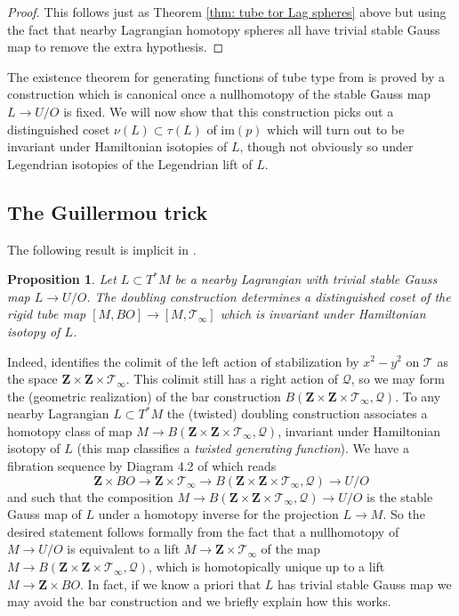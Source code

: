 \documentclass{amsart}
\newcommand\cQ{\mathcal{Q}}
\newcommand\cT{\mathcal{T}}
\def\bZ{\mathbf{Z}}
\newtheorem{proposition}[theorem]{Proposition}
\theoremstyle{definition}
\theoremstyle{remark}
\newtheorem{inductive lemma}[theorem]{Inductive Lemma}
\begin{document}
\begin{proof} This follows just as Theorem \ref{thm: tube tor Lag spheres}  above but using the fact that nearby Lagrangian homotopy spheres all have trivial stable Gauss map \cite{ACGK} to remove the extra hypothesis. \end{proof} 


The existence theorem for generating functions of tube type from \cite{ACGK} is proved by a construction which is canonical once a nullhomotopy of the stable Gauss map $L \to U/O$ is fixed. We will now show that this construction picks out a distinguished coset $\nu(L) \subset \tau(L)$ of  $\text{im}(p)$ which will turn out to be invariant under Hamiltonian isotopies of $L$, though not obviously so under Legendrian isotopies of the Legendrian lift of $L$. 

\subsection{The Guillermou trick} 
\label{sec: DoublingConstruction}

The following result is implicit in \cite{ACGK}.

\begin{proposition}\label{prop: natural coset}
Let $L \subset T^*M$ be a nearby Lagrangian with trivial stable Gauss map $L \to U/O$. The doubling construction determines a distinguished coset of the rigid tube map $[M,BO] \to [M,\cT_\infty ]$ which is invariant under Hamiltonian isotopy of $L$.
\end{proposition}

Indeed, \cite{ACGK} identifies the colimit of the left action of stabilization by $x^2-y^2$ on $\cT$ as the space $\bZ \times \bZ \times \cT_\infty$. This colimit still has a right action of $\cQ$, so we may form the (geometric realization) of the bar construction $B(\bZ \times \bZ \times \cT_\infty,\cQ)$. To any nearby Lagrangian $L \subset T^*M$ the (twisted) doubling construction associates a homotopy class of map  $M \to B(\bZ \times \bZ \times \cT_\infty,\cQ)$, invariant under Hamiltonian isotopy of $L$ (this map classifies a {\em twisted generating function}). We have a fibration sequence by Diagram 4.2 of \cite{ACGK} which reads
$$\bZ \times BO \to  \bZ  \times \cT_\infty \to B(\bZ \times \bZ \times \cT_\infty,\cQ) \to U/O$$
and such that the composition $M \to B(\bZ \times \bZ \times \cT_\infty,\cQ) \to U/O$ is the stable Gauss map of $L$ under a homotopy inverse for the projection $L \to M$. So the desired statement follows formally from the fact that a nullhomotopy of $M \to U/O$ is equivalent to a lift $M \to \bZ \times  \cT_\infty$ of the map $M \to B(\bZ \times \bZ \times \cT_\infty,\cQ)$, which is homotopically unique up to a lift $M \to \bZ \times BO$. In fact, if we know a priori that $L$ has trivial stable Gauss map we may avoid the bar construction and we briefly explain how this works. 
\end{document}
